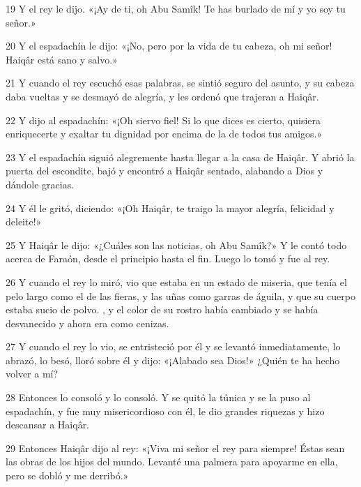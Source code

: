 \par 19 Y el rey le dijo. «¡Ay de ti, oh Abu Samîk! Te has burlado de mí y yo soy tu señor.»

\par 20 Y el espadachín le dijo: «¡No, pero por la vida de tu cabeza, oh mi señor! Haiqâr está sano y salvo.»

\par 21 Y cuando el rey escuchó esas palabras, se sintió seguro del asunto, y su cabeza daba vueltas y se desmayó de alegría, y les ordenó que trajeran a Haiqâr.

\par 22 Y dijo al espadachín: «¡Oh siervo fiel! Si lo que dices es cierto, quisiera enriquecerte y exaltar tu dignidad por encima de la de todos tus amigos.»

\par 23 Y el espadachín siguió alegremente hasta llegar a la casa de Haiqâr. Y abrió la puerta del escondite, bajó y encontró a Haiqâr sentado, alabando a Dios y dándole gracias.

\par 24 Y él le gritó, diciendo: «¡Oh Haiqâr, te traigo la mayor alegría, felicidad y deleite!»

\par 25 Y Haiqâr le dijo: «¿Cuáles son las noticias, oh Abu Samîk?» Y le contó todo acerca de Faraón, desde el principio hasta el fin. Luego lo tomó y fue al rey.

\par 26 Y cuando el rey lo miró, vio que estaba en un estado de miseria, que tenía el pelo largo como el de las fieras, y las uñas como garras de águila, y que su cuerpo estaba sucio de polvo. , y el color de su rostro había cambiado y se había desvanecido y ahora era como cenizas.

\par 27 Y cuando el rey lo vio, se entristeció por él y se levantó inmediatamente, lo abrazó, lo besó, lloró sobre él y dijo: «¡Alabado sea Dios!» ¿Quién te ha hecho volver a mí?

\par 28 Entonces lo consoló y lo consoló. Y se quitó la túnica y se la puso al espadachín, y fue muy misericordioso con él, le dio grandes riquezas y hizo descansar a Haiqâr.

\par 29 Entonces Haiqâr dijo al rey: «¡Viva mi señor el rey para siempre! Éstas sean las obras de los hijos del mundo. Levanté una palmera para apoyarme en ella, pero se dobló y me derribó.»

